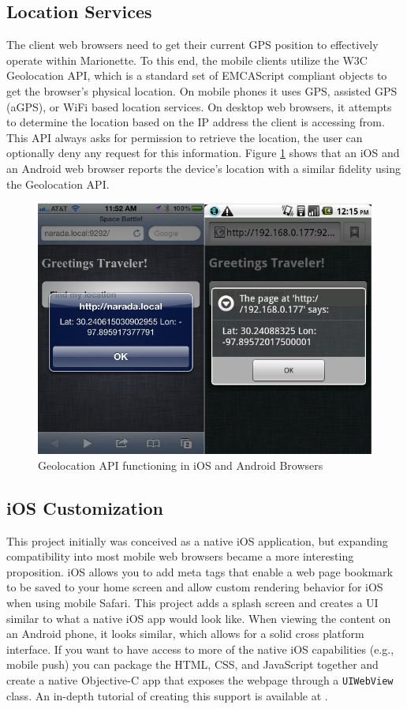 \documentclass[12pt]{report}	%
\theoremstyle{definition}
\theoremstyle{remark}
\begin{document}
\subsection{Location Services}

The client web browsers need to get their current GPS position to
effectively operate within Marionette. To this end, the mobile clients
utilize the W3C Geolocation API, which is a standard set of EMCAScript
compliant objects to get the browser's physical location. On mobile
phones it uses GPS, assisted GPS (aGPS), or WiFi based location
services. On desktop web browsers, it attempts to determine the location
based on the IP address the client is accessing from. This API always
asks for permission to retrieve the location, the user can optionally deny
any request for this information. Figure \ref{geoloc}
shows that an iOS and an Android web browser reports the device's
location with a similar fidelity using the Geolocation API.

\begin{figure}[h!]
\centering
\includegraphics[scale=0.6]{1.png}
\caption{Geolocation API functioning in iOS and Android Browsers}
\label{geoloc}
\end{figure}

\subsection{iOS Customization}

This project initially was conceived as a native iOS application, but
expanding compatibility into most mobile web browsers became a more
interesting proposition. iOS allows you to add meta tags that enable
a web page bookmark to be saved to your home screen and allow custom rendering
behavior for iOS when using mobile Safari. This project adds a splash
screen and creates a UI similar to what a native iOS app would look
like. When viewing the content on an Android phone, it looks similar,
which allows for a solid cross platform interface. If you want to have
access to more of the native iOS capabilities (e.g., mobile push) you can
package the HTML, CSS, and JavaScript together and create a native
Objective-C app that exposes the webpage through a
\texttt{UIWebView} class. An in-depth tutorial of
creating this support is available at \cite{mightios}.
\end{document}
